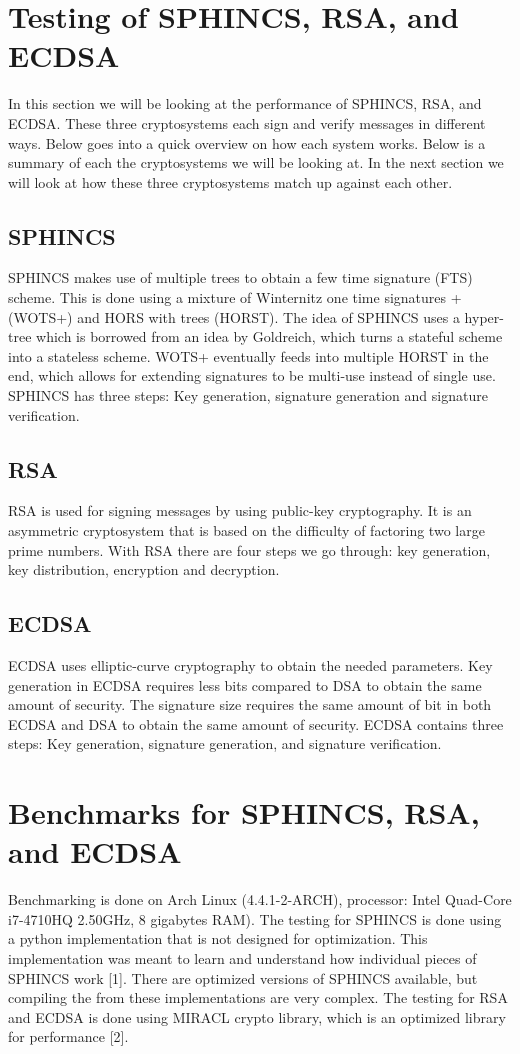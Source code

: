\documentclass[12pt,a4paper]{article}
\begin{document}
\section*{Testing of SPHINCS, RSA, and ECDSA}
In this section we will be looking at the performance of SPHINCS, RSA, and ECDSA. These three cryptosystems each sign and verify messages in different ways. Below goes into a quick overview on how each system works. Below is a summary of each the cryptosystems we will be looking at. In the next section we will look at how these three cryptosystems match up against each other.

\subsection*{SPHINCS}
SPHINCS makes use of multiple trees to obtain a few time signature (FTS) scheme. This is done using a mixture of Winternitz one time signatures + (WOTS+) and HORS with trees (HORST). The idea of SPHINCS uses a hyper-tree which is borrowed from an idea by Goldreich, which turns a stateful scheme into a stateless scheme. WOTS+ eventually feeds into multiple HORST in the end, which allows for extending signatures to be multi-use instead of single use. SPHINCS has three steps: Key generation, signature generation and signature verification.

\subsection*{RSA}
RSA is used for signing messages by using public-key cryptography. It is an asymmetric cryptosystem that is based on the difficulty of factoring two large prime numbers. With RSA there are four steps we go through: key generation, key distribution, encryption and decryption.

\subsection*{ECDSA}
ECDSA uses elliptic-curve cryptography to obtain the needed parameters. Key generation in ECDSA requires less bits compared to DSA to obtain the same amount of security. The signature size requires the same amount of bit in both ECDSA and DSA to obtain the same amount of security. ECDSA contains three steps: Key generation, signature generation, and signature verification.

\section*{Benchmarks for SPHINCS, RSA, and ECDSA}
Benchmarking is done on Arch Linux (4.4.1-2-ARCH), processor: Intel Quad-Core i7-4710HQ 2.50GHz, 8 gigabytes RAM). The testing for SPHINCS is done using a python implementation that is not designed for optimization. This implementation was meant to learn and understand how individual pieces of SPHINCS work [1]. There are optimized versions of SPHINCS available, but compiling the from these implementations are very complex. The testing for RSA and ECDSA is done using MIRACL crypto library, which is an optimized library for performance [2].
\end{document}
